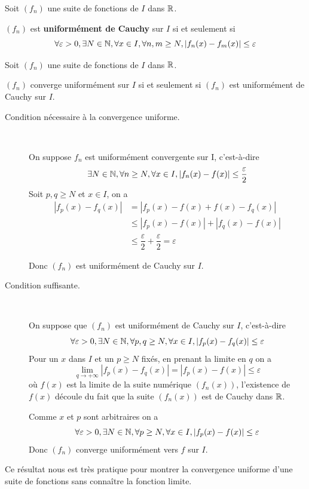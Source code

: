 \documentclass[a4paper, 12pt]{article}
\begin{document}
\vspace{0.5cm}

\begin{definition}
    Soit $(f_n)$ une suite de fonctions de $I$ dans $\mathbb{R}$.

    $(f_n)$ est \textbf{uniformément de Cauchy} sur $I$ si et seulement si
    $$
    \forall \varepsilon > 0, \exists N \in \mathbb{N}, \forall x \in I, \forall n, m \geq N, |f_n(x) - f_m(x)| \leq \varepsilon
    $$
\end{definition}

\begin{theoreme}{}{}
    Soit $(f_n)$ une suite de fonctions de $I$ dans $\mathbb{R}$.

    $(f_n)$ converge uniformément sur $I$ si et seulement si $(f_n)$ est uniformément de Cauchy sur $I$.
\end{theoreme}

\begin{demonstration}
    \begin{description}
        \item[Condition nécessaire à la convergence uniforme.]~\par
        On suppose $f_n$ est uniformément convergente sur I, c'est-à-dire
        $$
        \exists N \in \mathbb{N}, \forall n \geq N, \forall x \in I, |f_n(x) - f(x)| \leq \dfrac{\varepsilon}{2}
        $$
        Soit $p, q \geq N$ et $x \in I$, on a
        \begin{align*}
            |f_p(x) - f_q(x)| & = |f_p(x) - f(x) + f(x) - f_q(x)| \\
            & \leq |f_p(x) - f(x)| + |f_q(x) - f(x)| \\
            & \leq \dfrac{\varepsilon}{2} + \dfrac{\varepsilon}{2} = \varepsilon
        \end{align*}
        
        Donc $(f_n)$ est uniformément de Cauchy sur $I$.

        \item[Condition suffisante.]~\par
        On suppose que $(f_n)$ est uniformément de Cauchy sur $I$, c'est-à-dire
        $$
        \forall \varepsilon > 0, \exists N \in \mathbb{N}, \forall p, q \geq N, \forall x \in I, |f_p(x) - f_q(x)| \leq \varepsilon
        $$
        Pour un $x$ dans $I$ et un $p \geq N$ fixés, en prenant la limite en $q$ on a
        $$
        \lim\limits_{q \to +\infty} |f_p(x) - f_q(x)| = |f_p(x) - f(x)| \leq \varepsilon
        $$
        où $f(x)$ est la limite de la suite numérique $(f_n(x))$, l'existence de $f(x)$ découle du fait que la suite $(f_n(x))$ est de Cauchy dans $\mathbb{R}$.

        Comme $x$ et $p$ sont arbitraires on a
        $$
        \forall \varepsilon > 0, \exists N \in \mathbb{N}, \forall p \geq N, \forall x \in I, |f_p(x) - f(x)| \leq \varepsilon
        $$
        Donc $(f_n)$ converge uniformément vers $f$ sur $I$.
        
    \end{description}
\end{demonstration}

\begin{remarque}
    Ce résultat nous est très pratique pour montrer la convergence uniforme d'une suite de fonctions sans connaître la fonction limite.
\end{remarque}
\end{document}
